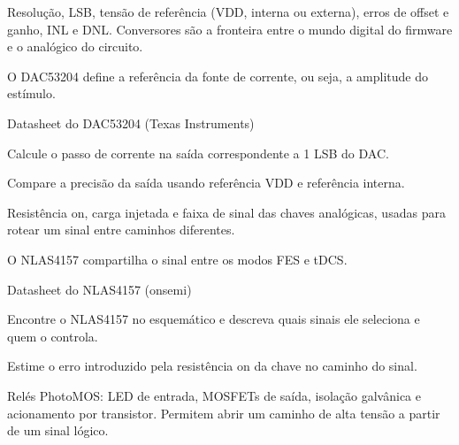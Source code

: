 Resolução, LSB, tensão de referência (VDD, interna ou externa), erros de offset e ganho, INL e DNL. Conversores são a fronteira entre o mundo digital do firmware e o analógico do circuito.

\begin{noproduto}
O DAC53204 define a referência da fonte de corrente, ou seja, a amplitude do estímulo.
\end{noproduto}

\begin{paraestudar}
  \item {}
  \item Datasheet do DAC53204 (Texas Instruments)
\end{paraestudar}

\begin{pratique}
  \item Calcule o passo de corrente na saída correspondente a 1 LSB do DAC.
  \item Compare a precisão da saída usando referência VDD e referência interna.
\end{pratique}

Resistência on, carga injetada e faixa de sinal das chaves analógicas, usadas para rotear um sinal entre caminhos diferentes.

\begin{noproduto}
O NLAS4157 compartilha o sinal entre os modos FES e tDCS.
\end{noproduto}

\begin{paraestudar}
  \item Datasheet do NLAS4157 (onsemi)
\end{paraestudar}

\begin{pratique}
  \item Encontre o NLAS4157 no esquemático e descreva quais sinais ele seleciona e quem o controla.
  \item Estime o erro introduzido pela resistência on da chave no caminho do sinal.
\end{pratique}

Relés PhotoMOS: LED de entrada, MOSFETs de saída, isolação galvânica e acionamento por transistor. Permitem abrir um caminho de alta tensão a partir de um sinal lógico.

